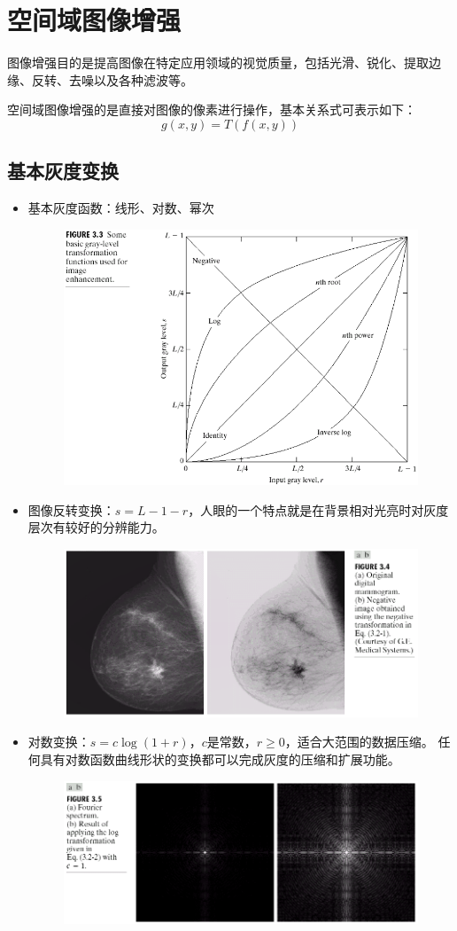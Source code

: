 
\section{空间域图像增强}
图像增强目的是提高图像在特定应用领域的视觉质量，包括光滑、锐化、提取边缘、反转、去噪以及各种滤波等。

空间域图像增强的是直接对图像的像素进行操作，基本关系式可表示如下：
\[g(x,y)=T(f(x,y))\]

\subsection{基本灰度变换}
\begin{itemize}
\item 基本灰度函数：线形、对数、幂次
\begin{figure}[H]
\centering
\includegraphics[width=0.6\linewidth]{fig/enhancement.png}
\end{figure}
\item 图像反转变换：$s=L-1-r$，人眼的一个特点就是在背景相对光亮时对灰度层次有较好的分辨能力。
\begin{figure}[H]
\centering
\includegraphics[width=0.6\linewidth]{fig/trans-inverse.png}
\end{figure}
\item 对数变换：$s=c\log(1+r)$，$c$是常数，$r\geq 0$，适合大范围的数据压缩。
任何具有对数函数曲线形状的变换都可以完成灰度的压缩和扩展功能。 
\begin{figure}[H]
\centering
\includegraphics[width=0.6\linewidth]{fig/trans-log.png}

\end{figure}
\end{itemize}

